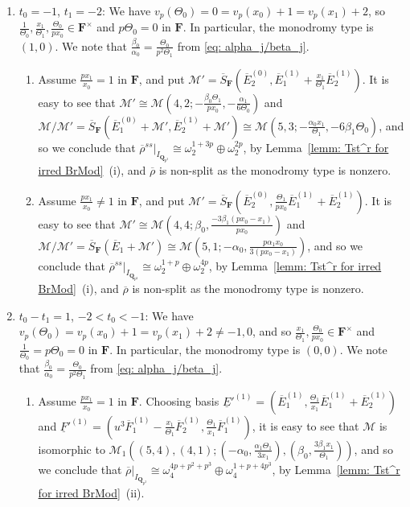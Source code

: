 \documentclass[11pt]{amsart}
\theoremstyle{definition}
\numberwithin{equation}{subsection}
\theoremstyle{plain}
\theoremstyle{plain}
\theoremstyle{plain}
\theoremstyle{plain}
\theoremstyle{plain}
\theoremstyle{plain}
\theoremstyle{plain}
\theoremstyle{plain}
\theoremstyle{plain}
\theoremstyle{plain}
\theoremstyle{plain}
\theoremstyle{plain}
\theoremstyle{definition}
\theoremstyle{definition}
\theoremstyle{definition}
\theoremstyle{remark}
\renewcommand{\(}{\textup{(}}
\renewcommand{\)}{\textup{)}}
\newcommand{\Q}{\mathbf{Q}}
\newcommand{\F}{\mathbf{F}}
\newcommand{\barS}{\overline{S}}
\newcommand{\rhobar}{\overline{\rho}}
\newcommand{\cM}{\mathcal{M}}
\newcommand{\barE}{\overline{E}}
\newcommand{\barF}{\overline{F}}
\newcommand{\IQptwo}{{I_{\Q_{p^2}}}}
\newcommand{\baseE}{\underline{E}}
\newcommand{\baseF}{\underline{F}}
\begin{document}
\begin{enumerate}[leftmargin=*]
  \item $t_0=-1$, $t_1=-2$: We have $v_p(\Theta_0)=0=v_p(x_0)+1=v_p(x_1)+2$, so $\frac{1}{\Theta_0},\frac{x_1}{\Theta_1},\frac{\Theta_0}{px_0}\in\F^\times$ and $p\Theta_0=0$ in $\F$. In particular, the monodromy type is $(1,0)$. We note that $\frac{\beta_0}{\alpha_0}=\frac{\Theta_0}{p^2\Theta_1}$ from \eqref{eq: alpha_j/beta_j}.
      \begin{enumerate}[leftmargin=*]
        \item Assume $\frac{px_1}{x_0}=1$ in $\F$, and put $\cM'=\barS_{\F}(\barE_2^{(0)},\barE_1^{(1)}+\frac{x_1}{\Theta_1}\barE_2^{(1)})$. It is easy to see that $\cM'\cong\cM(4,2;-\frac{\beta_0\Theta_1}{px_0}, -\frac{\alpha_1}{6\Theta_0})$ and $\cM/\cM'=\barS_{\F}(\barE_1^{(0)}+\cM',\barE_2^{(1)}+\cM')\cong \cM(5,3;-\frac{\alpha_0x_1}{\Theta_1},-6\beta_1\Theta_0)$, and so we conclude that $\rhobar^{ss}|_\IQptwo\cong\omega_2^{1+3p}\oplus\omega_2^{2p}$, by Lemma~\ref{lemm: Tst^r for irred BrMod}~(i), and $\rhobar$ is non-split as the monodromy type is nonzero.
        \item Assume $\frac{px_1}{x_0}\neq 1$ in $\F$, and put $\cM'=\barS_{\F}(\barE_2^{(0)},\frac{\Theta_1}{px_0}\barE_1^{(1)}+\barE_2^{(1)})$. It is easy to see that $\cM'\cong\cM(4,4;\beta_0,\frac{-3\beta_1(px_0-x_1)}{px_0})$ and $\cM/\cM'=\barS_{\F}(\barE_1+\cM')\cong\cM(5,1;-\alpha_0,\frac{p\alpha_1x_0}{3(px_0-x_1)})$, and so we conclude that $\rhobar^{ss}|_\IQptwo\cong\omega_2^{1+p}\oplus\omega_2^{4p}$, by Lemma~\ref{lemm: Tst^r for irred BrMod}~(i), and $\rhobar$ is non-split as the monodromy type is nonzero.
      \end{enumerate}
  \item $t_0-t_1=1$, $-2<t_0<-1$: We have $v_p(\Theta_0)=v_p(x_0)+1=v_p(x_1)+2\neq -1,0$, and so $\frac{x_1}{\Theta_1},\frac{\Theta_0}{px_0}\in\F^\times$ and $\frac{1}{\Theta_0}=p\Theta_0=0$ in $\F$. In particular, the monodromy type is $(0,0)$. We note that $\frac{\beta_0}{\alpha_0}=\frac{\Theta_0}{p^2\Theta_1}$ from \ref{eq: alpha_j/beta_j}.
      \begin{enumerate}[leftmargin=*]
        \item Assume $\frac{px_1}{x_0}=1$ in $\F$. Choosing basis $\baseE'^{(1)}=(\barE_1^{(1)}, \frac{\Theta_1}{x_1}\barE_1^{(1)}+\barE_2^{(1)})$ and $\baseF'^{(1)}=(u^3\barF_1^{(1)}-\frac{x_1}{\Theta_1}\barF_2^{(1)}, \frac{\Theta_1}{x_1}\barF_1^{(1)})$, it is easy to see that $\cM$ is isomorphic to $\cM_1((5,4),(4,1);(-\alpha_0,\frac{\alpha_1\Theta_1}{3x_1}),(\beta_0,\frac{3\beta_1x_1}{\Theta_1}))$, and so we conclude that $\rhobar|_\IQptwo\cong\omega_4^{4p+p^2+p^3}\oplus\omega_4^{1+p+4p^3}$, by Lemma~\ref{lemm: Tst^r for irred BrMod}~(ii).

\end{enumerate}
\end{enumerate}
\end{document}
